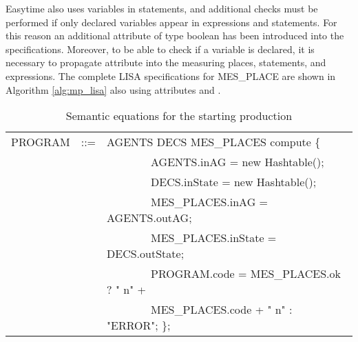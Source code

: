 \documentclass[preprint, prX]{revtex4}
\begin{document}
Easytime also uses variables in statements, and additional checks must be performed if only declared variables appear in expressions and statements. For this reason an additional attribute  of type boolean has been introduced into the specifications. Moreover, to be able to check if a variable is declared, it is necessary to propagate attribute  into the measuring places, statements, and expressions. The complete LISA specifications for MES\_PLACE are shown in Algorithm \ref{alg:mp_lisa} also using attributes  and .

\begin{table}[htb]           \caption{Semantic equations for the starting production}
\label{tab:tab28}
\footnotesize
\vspace{-5mm}
\begin{center}
\begin{tabular}{ | l  l  l | }
\hline
 PROGRAM & ::= & AGENTS DECS MES\_PLACES  compute \{ \\
 & &  \ \ \ \ \ \ \ \ AGENTS.inAG = new Hashtable(); \\
 & &  \ \ \ \ \ \ \ \ DECS.inState = new Hashtable(); \\
 & &  \ \ \ \ \ \ \ \ MES\_PLACES.inAG = AGENTS.outAG; \\
 & &  \ \ \ \ \ \ \ \ MES\_PLACES.inState = DECS.outState; \\
 & &  \ \ \ \ \ \ \ \ PROGRAM.code = MES\_PLACES.ok ? " n" + \\
 & &  \ \ \ \ \ \ \ \ MES\_PLACES.code + " n" : "ERROR"; \}; \\
\hline
\end{tabular}
\end{center}
\vspace{-5mm}
\normalsize
\end{table}
\end{document}
